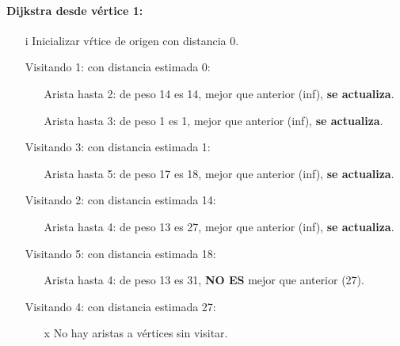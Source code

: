 \documentclass[../tp2_grupo404.tex]{subfiles}
\begin{document}
\paragraph{Dijkstra desde v\'ertice 1:}\par
\begin{enumerate}
\item[i] Inicializar v\'rtice de origen con distancia 0.
 \item[Visitando 1:] con distancia estimada 0:
\begin{enumerate}
   \item[Arista hasta 2:] de peso 14 es 14, mejor que anterior (inf), \textbf{se actualiza}.
   \item[Arista hasta 3:] de peso 1 es 1, mejor que anterior (inf), \textbf{se actualiza}.
\end{enumerate}

 \item[Visitando 3:] con distancia estimada 1:
\begin{enumerate}
   \item[Arista hasta 5:] de peso 17 es 18, mejor que anterior (inf), \textbf{se actualiza}.
\end{enumerate}

 \item[Visitando 2:] con distancia estimada 14:
\begin{enumerate}
   \item[Arista hasta 4:] de peso 13 es 27, mejor que anterior (inf), \textbf{se actualiza}.
\end{enumerate}

 \item[Visitando 5:] con distancia estimada 18:
\begin{enumerate}
   \item[Arista hasta 4:] de peso 13 es 31, \textbf{NO ES} mejor que anterior (27).
\end{enumerate}

 \item[Visitando 4:] con distancia estimada 27:
\begin{enumerate}
   \item[x] No hay aristas a v\'ertices sin visitar.
\end{enumerate}

\end{enumerate}
\end{document}
